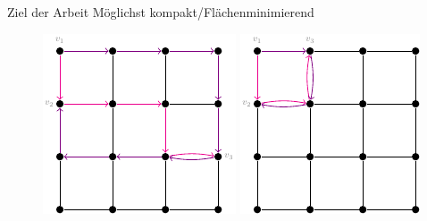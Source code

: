 \documentclass[9pt]{beamer}
\begin{document}
\begin{frame}{Ziel der Arbeit}
    Möglichst kompakt/Flächenminimierend
    \begin{figure}
        \centering
        \begin{minipage}{0.48\textwidth}
            \centering
            \includegraphics[width=\linewidth]{figures/Erlaubt.pdf}
        \end{minipage}\hfill
        \begin{minipage}{0.48\textwidth}
            \centering
            \includegraphics[width=\linewidth]{figures/Erlaubt2.pdf}
        \end{minipage}
    \end{figure}
\end{frame}
\end{document}
